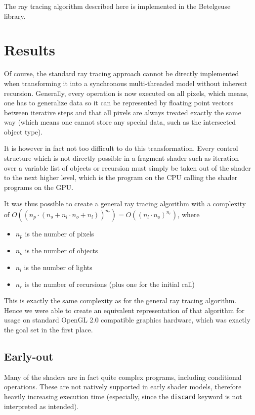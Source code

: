 \documentclass[english,fleqn,10pt,twocolumn]{article}
\begin{document}
The ray tracing algorithm described here is implemented in the Betelgeuse library.


\section{Results}

Of course, the standard ray tracing approach cannot be directly implemented when transforming it into a synchronous multi-threaded model without inherent recursion. Generally, every operation is now executed on all pixels, which means,
one has to generalize data so it can be represented by floating point vectors between iterative steps and that all pixels are always treated exactly the same way (which means one cannot store any special data, such as the intersected
object type).

It is however in fact not too difficult to do this transformation. Every control structure which is not directly possible in a fragment shader such as iteration over a variable list of objects or recursion must simply be taken out of the
shader to the next higher level, which is the program on the CPU calling the shader programs on the GPU.

It was thus possible to create a general ray tracing algorithm with a complexity of $O((n_p \cdot (n_o + n_l \cdot n_o + n_l))^{n_r}) = O((n_l \cdot n_o)^{n_r})$, where
\begin{itemize}
    \item $n_p$ is the number of pixels
    \item $n_o$ is the number of objects
    \item $n_l$ is the number of lights
    \item $n_r$ is the number of recursions (plus one for the initial call)
\end{itemize}

This is exactly the same complexity as for the general ray tracing algorithm. Hence we were able to create an equivalent representation of that algorithm for usage on standard OpenGL 2.0 compatible graphics hardware, which was exactly
the goal set in the first place.

\subsection{Early-out}

Many of the shaders are in fact quite complex programs, including conditional operations. These are not natively supported in early shader models, therefore heavily increasing execution time (especially, since the {\tt discard} keyword
is not interpreted as intended).
\end{document}
